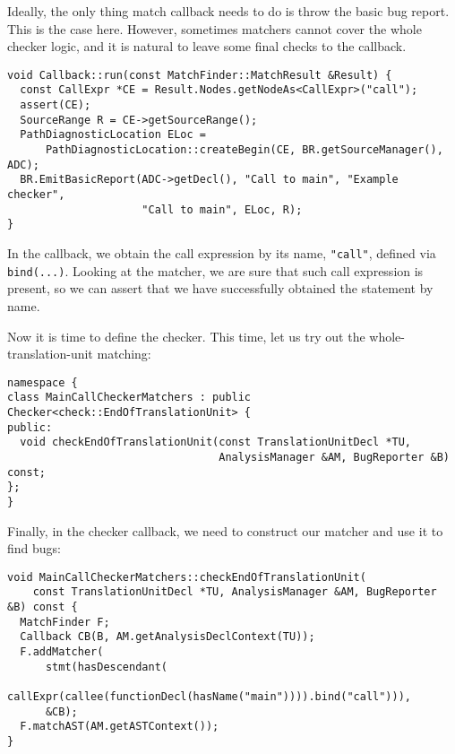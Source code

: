 \documentclass[a4paper,12pt]{article}
\newenvironment{nobr}{\begin{minipage}{\textwidth}\setlength\parskip{1em}
}{\end{minipage}\ignorespacesafterend}
\begin{document}
\begin{nobr}
Ideally, the only thing match callback needs to do is throw the basic bug report. This is the case here. However, sometimes matchers cannot cover the whole checker logic, and it is natural to leave some final checks to the callback.

\begin{lstlisting}[style=cplusplus,numbers=none]
void Callback::run(const MatchFinder::MatchResult &Result) {
  const CallExpr *CE = Result.Nodes.getNodeAs<CallExpr>("call");
  assert(CE);
  SourceRange R = CE->getSourceRange();
  PathDiagnosticLocation ELoc =
      PathDiagnosticLocation::createBegin(CE, BR.getSourceManager(), ADC);
  BR.EmitBasicReport(ADC->getDecl(), "Call to main", "Example checker",
                     "Call to main", ELoc, R);
}
\end{lstlisting}
\end{nobr}

In the callback, we obtain the call expression by its name, \lstinline|"call"|, defined via \lstinline|bind(...)|. Looking at the matcher, we are sure that such call expression is present, so we can assert that we have successfully obtained the statement by name.

\begin{nobr}
Now it is time to define the checker. This time, let us try out the whole-translation-unit matching:
\begin{lstlisting}[style=cplusplus,numbers=none]
namespace {
class MainCallCheckerMatchers : public Checker<check::EndOfTranslationUnit> {
public:
  void checkEndOfTranslationUnit(const TranslationUnitDecl *TU,
                                 AnalysisManager &AM, BugReporter &B) const;
};
}
\end{lstlisting}
\end{nobr}

\begin{nobr}
Finally, in the checker callback, we need to construct our matcher and use it to find bugs:
\begin{lstlisting}[style=cplusplus,numbers=none]
void MainCallCheckerMatchers::checkEndOfTranslationUnit(
    const TranslationUnitDecl *TU, AnalysisManager &AM, BugReporter &B) const {
  MatchFinder F;
  Callback CB(B, AM.getAnalysisDeclContext(TU));
  F.addMatcher(
      stmt(hasDescendant(
          callExpr(callee(functionDecl(hasName("main")))).bind("call"))),
      &CB);
  F.matchAST(AM.getASTContext());
}
\end{lstlisting}
\end{nobr}
\end{document}

